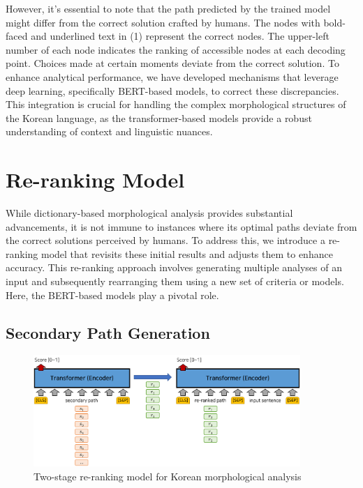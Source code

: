 \documentclass[AMS,STIX2COL]{WileyNJD-v2}
\begin{document}
    However, it's essential to note that the path predicted by the trained model might differ from the correct solution crafted by humans.
    The nodes with bold-faced and underlined text in (1) represent the correct nodes.
    The upper-left number of each node indicates the ranking of accessible nodes at each decoding point.
    Choices made at certain moments deviate from the correct solution.
    To enhance analytical performance, we have developed mechanisms that leverage deep learning, specifically BERT-based models, to correct these discrepancies.
    This integration is crucial for handling the complex morphological structures of the Korean language, as the transformer-based models provide a robust understanding of context and linguistic nuances.


    \section{Re-ranking Model}\label{sec:reranking-model}

    While dictionary-based morphological analysis provides substantial advancements, it is not immune to instances where its optimal paths deviate from the correct solutions perceived by humans.
    To address this, we introduce a re-ranking model that revisits these initial results and adjusts them to enhance accuracy.
    This re-ranking approach involves generating multiple analyses of an input and subsequently rearranging them using a new set of criteria or models.
    Here, the BERT-based models play a pivotal role.

    \subsection{Secondary Path Generation}\label{subsec:secondary-path-generation}

    \begin{figure}[ht]
        \centerline{\includegraphics[width=0.9\textwidth]{fig;ranking-v2}}
        \caption{Two-stage re-ranking model for Korean morphological analysis}
        \label{fig:ranking}
    \end{figure}
\end{document}

